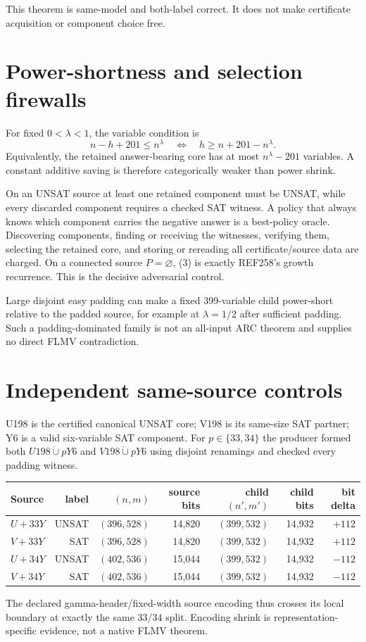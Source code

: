 \documentclass[11pt]{article}
\begin{document}
This theorem is same-model and both-label correct.  It does not make certificate acquisition or component choice free.

\section{Power-shortness and selection firewalls}
For fixed $0<\lambda<1$, the variable condition is
\[
 n-h+201\le n^\lambda
 \quad\Longleftrightarrow\quad
 h\ge n+201-n^\lambda.                                               \tag{4}
\]
Equivalently, the retained answer-bearing core has at most $n^\lambda-201$ variables.  A constant additive saving is therefore categorically weaker than power shrink.

On an UNSAT source at least one retained component must be UNSAT, while every discarded component requires a checked SAT witness.  A policy that always knows which component carries the negative answer is a best-policy oracle.  Discovering components, finding or receiving the witnesses, verifying them, selecting the retained core, and storing or rereading all certificate/source data are charged.  On a connected source $P=\varnothing$, (3) is exactly REF258's growth recurrence.  This is the decisive adversarial control.

Large disjoint easy padding can make a fixed 399-variable child power-short relative to the padded source, for example at $\lambda=1/2$ after sufficient padding.  Such a padding-dominated family is not an all-input ARC theorem and supplies no direct FLMV contradiction.

\section{Independent same-source controls}
U198 is the certified canonical UNSAT core; V198 is its same-size SAT partner; Y6 is a valid six-variable SAT component.  For $p\in\{33,34\}$ the producer formed both
$U198\mathbin{\dot\cup}pY6$ and $V198\mathbin{\dot\cup}pY6$ using disjoint renamings and checked every padding witness.

\begin{center}
\begin{tabular}{lrrrrrr}
\toprule
Source & label & $(n,m)$ & source bits & child $(n',m')$ & child bits & bit delta\\
\midrule
$U+33Y$ & UNSAT & $(396,528)$ & 14,820 & $(399,532)$ & 14,932 & $+112$\\
$V+33Y$ & SAT   & $(396,528)$ & 14,820 & $(399,532)$ & 14,932 & $+112$\\
$U+34Y$ & UNSAT & $(402,536)$ & 15,044 & $(399,532)$ & 14,932 & $-112$\\
$V+34Y$ & SAT   & $(402,536)$ & 15,044 & $(399,532)$ & 14,932 & $-112$\\
\bottomrule
\end{tabular}
\end{center}
The declared gamma-header/fixed-width source encoding thus crosses its local boundary at exactly the same $33/34$ split.  Encoding shrink is representation-specific evidence, not a native FLMV theorem.
\end{document}
